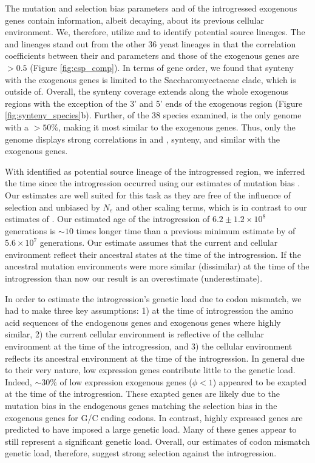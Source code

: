 \documentclass[fleqn,letterpaper]{article}
\begin{document}
The mutation and selection bias parameters \DM and \DE of the introgressed exogenous genes contain information, albeit decaying, about its previous cellular environment.
We, therefore, utilize \DM and \DE to identify potential source lineages.
The \gossypii and \dubl lineages stand out from the other 36 yeast lineages in that the correlation coefficients between their \DM and \DE parameters and those of the exogenous genes are $>0.5$  (Figure \ref{fig:csp_comp}).
In terms of gene order, we found that synteny with the exogenous genes is limited to the Saccharomycetaceae clade, which \dubl is outside of.
Overall, the synteny coverage extends along the whole exogenous regions with the exception of the 3' and 5' ends of the exogenous region   (Figure \ref{fig:synteny_species}b). 
Further, of the 38 species examined, \gossypii is the only genome with a \GC $> 50 \%$, making it most similar to the exogenous genes.
Thus, only the \gossypii genome displays strong correlations in \DM and \DE, synteny, and similar \GC  with the exogenous genes.

With \gossypii identified as potential source lineage of the introgressed region, we inferred the time since the introgression occurred using our estimates of mutation bias \DM.
Our \DM estimates are well suited for this task as they are free of the influence of selection and unbiased by $N_e$ and other scaling terms, which is in contrast to our estimates of \DE \citep{gilchrist2015}.
Our estimated age of the introgression of $6.2\pm1.2\times 10^8$ generations is $\sim 10$ times longer time than a previous minimum estimate by \citet{friedrich2015} of $5.6\times 10^7$ generations.
Our estimate assumes that the current \gossypii and \kluyveri cellular environment reflect their ancestral states at the time of the introgression.
If the ancestral mutation environments were more similar (dissimilar) at the time of the introgression than now our result is an overestimate (underestimate).

In order to estimate the introgression's genetic load due to codon mismatch, we had to make three key assumptions: 1) at the time of introgression the amino acid sequences of the endogenous genes and exogenous genes where highly similar, 2) the current \kluyveri cellular environment is reflective of the cellular environment at the time of the introgression, and 3) the \gossypii cellular environment reflects its ancestral environment at the time of the introgression.
In general due to their very nature, low expression genes contribute little to the genetic load.
Indeed, $\sim 30 \%$ of low expression exogenous genes ($\phi < 1$) appeared to be exapted at the time of the introgression.
These exapted genes are likely due to the mutation bias in the endogenous genes matching the selection bias in the exogenous genes for G/C ending codons.
In contrast, highly expressed genes are predicted to have imposed a large genetic load.
Many of these genes appear to still represent a significant genetic load.
Overall, our estimates of codon mismatch genetic load, therefore, suggest strong selection against the introgression.
\end{document}
